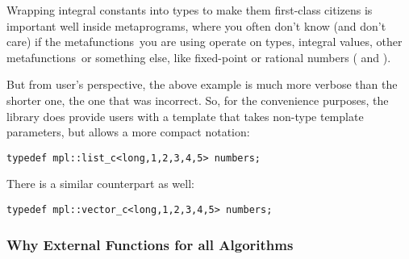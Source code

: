 \documentclass{kapproc}
\newcommand{\mfns}{meta\-func\-tions}
\begin{document}
Wrapping integral constants into types to make them 
first-class citizens is important well inside metaprograms, 
where you often don't know (and don't care) if the 
\mfns\ you are using operate on types, integral 
values, other \mfns\, or something else, like 
fixed-point or rational numbers ( 
and ).

But from user's perspective, the above example is much more
verbose than the shorter one, the one that was incorrect. So, 
for the convenience purposes, the library does provide users 
with a template that takes non-type template parameters, but 
allows a more compact notation:

{\small
\begin{codesamp}\begin{verbatim}
typedef mpl::list_c<long,1,2,3,4,5> numbers;
\end{verbatim}
\end{codesamp}
}

There is a similar  counterpart as well:

{\small
\begin{codesamp}\begin{verbatim}
typedef mpl::vector_c<long,1,2,3,4,5> numbers;
\end{verbatim}
\end{codesamp}
}


\subsubsection{Why External Functions for all Algorithms}
\end{document}
